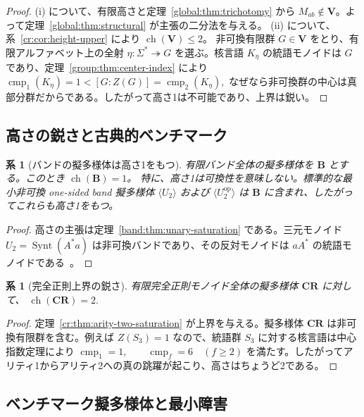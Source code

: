 \documentclass[10pt,a4paper]{ltjsarticle}
\newtheorem{corollary}[theorem]{系}
\theoremstyle{definition}
\theoremstyle{remark}
\newcommand{\cmp}{\operatorname{cmp}}
\begin{document}
\begin{proof}
\textup{(i)} について、有限高さと定理~\ref{global:thm:trichotomy} から
$M_{ab}\notin\mathbf V$。よって定理~\ref{global:thm:structural} が主張の二分法を与える。
\textup{(ii)} について、系~\ref{cr:cor:height-upper} により
\(\operatorname{ch}(\mathbf V)\le2\)。
非可換有限群 $G\in\mathbf V$ をとり、有限アルファベット上の全射
\(\eta:\Sigma^*\twoheadrightarrow G\)
を選ぶ。核言語 $K_\eta$ の統語モノイドは $G$ であり、定理~\ref{group:thm:center-index} により
\(
 \cmp_1(K_\eta)=1< [G:Z(G)]=\cmp_2(K_\eta),
\)
なぜなら非可換群の中心は真部分群だからである。したがって高さ1は不可能であり、上界は鋭い。
\end{proof}

\subsection{高さの鋭さと古典的ベンチマーク}

\begin{corollary}[バンドの擬多様体は高さ1をもつ]
\label{band:cor:height-one}
有限バンド全体の擬多様体を \(\mathbf B\) とする。このとき
\(\operatorname{ch}(\mathbf B)=1\)。
特に、高さ1は可換性を意味しない。標準的な最小非可換 one-sided band 擬多様体
\(\langle U_2\rangle\) および \(\langle U_2^{\mathrm{op}}\rangle\)
は \(\mathbf B\) に含まれ、したがってこれらも高さ1をもつ。
\end{corollary}

\begin{proof}
高さの主張は定理~\ref{band:thm:unary-saturation} である。三元モノイド
\(U_2=\operatorname{Synt}(A^*a)\)
は非可換バンドであり、その反対モノイドは $aA^*$ の統語モノイドである~\cite{MargolisPin1984}。
\end{proof}

\begin{corollary}[完全正則上界の鋭さ]
\label{cr:cor:height}
有限完全正則モノイド全体の擬多様体 $\mathbf{CR}$ に対して、
\(
\operatorname{ch}(\mathbf{CR})=2.
\)
\end{corollary}

\begin{proof}
定理~\ref{cr:thm:arity-two-saturation} が上界を与える。擬多様体 $\mathbf{CR}$ は非可換有限群を含む。例えば
$Z(S_3)=1$
なので、統語群 $S_3$ に対する核言語は中心指数定理により
\(\cmp_1=1, \qquad \cmp_f=6\quad(f\ge2)\)
を満たす。したがってアリティ1からアリティ2への真の跳躍が起こり、高さはちょうど2である。
\end{proof}

\subsection{ベンチマーク擬多様体と最小障害}
\end{document}
